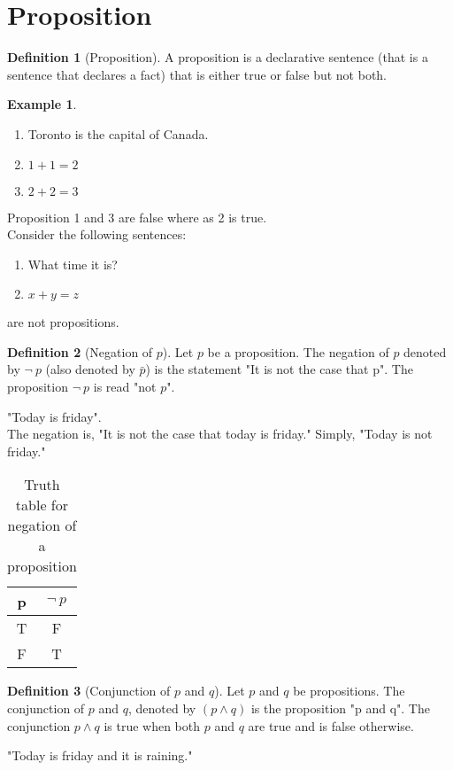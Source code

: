 \documentclass[12pt,oneside,a4paper]{book}
\theoremstyle{remark}
\theoremstyle{definition}
\newtheorem{defn}{Definition}
\newtheorem*{ex}{Example}
\begin{document}
\section{Proposition}
\begin{defn}[Proposition]
    A proposition is a declarative sentence (that is a sentence that declares a fact) that is either true or false but not both.
\end{defn}
\begin{ex}
    \hfill
    \begin{enumerate}
        \item Toronto is the capital of Canada.
        \item \(1+1=2\)
        \item $2+2=3$
    \end{enumerate}
    Proposition 1 and 3 are false where as 2 is true.\\
    Consider the following sentences:
    \begin{enumerate}
        \item What time it is?
        \item $x+y=z$
    \end{enumerate}
    are not propositions.
\end{ex}
\begin{defn}[Negation of $ p $]
    Let $p$ be a proposition.
    The negation of $p$ denoted by $\neg\ p$ (also denoted by $\bar{p}$) is the statement "It is not the case that p".
    The proposition $\neg\ p$ is read "not $p$".
\end{defn}
"Today is friday". \\
The negation is, "It is not the case that today is friday."
Simply, "Today is not friday."
\begin{table}[H]
    \centering
    \begin{tabular}{|c|c|}
        \hline
        p & \(\neg\ p\) \\ \hline
        T & F           \\ \hline
        F & T           \\ \hline
    \end{tabular}
    \caption{Truth table for negation of a proposition}
\end{table}
\begin{defn}[Conjunction of \(p\) and \(q\)]
    Let \(p\) and \(q\) be propositions. The conjunction of \(p\) and \(q\), denoted by \((p\wedge q)\) is the proposition "p and q". The conjunction \(p\wedge q\) is true when both \(p\) and \(q\) are true and is false otherwise.
\end{defn}
"Today is friday and it is raining."
\end{document}

